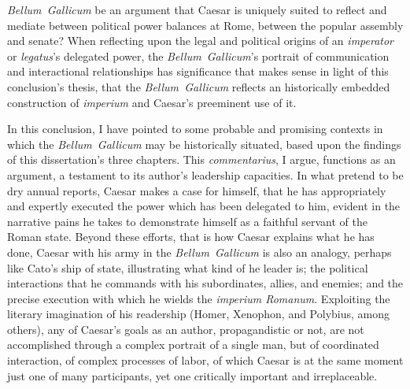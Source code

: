 \documentclass[12pt,letterpaper,oneside,final]{memoir}
\begin{document}
\emph{Bellum~Gallicum} be an argument that Caesar is uniquely suited to reflect and mediate between political power balances at Rome, between the popular assembly and senate? When reflecting upon the legal and political origins of an \emph{imperator} or \emph{legatus}'s delegated power, the \emph{Bellum~Gallicum}'s portrait of communication and interactional relationships has significance that makes sense in light of this conclusion's thesis, that the \emph{Bellum~Gallicum} reflects an historically embedded construction of \emph{imperium} and Caesar's preeminent use of it.

In this conclusion, I have pointed to some probable and promising contexts in which the \emph{Bellum~Gallicum} may be historically situated, based upon the findings of this dissertation's three chapters. This \emph{commentarius}, I argue, functions as an argument, a testament to its author's leadership capacities. In what pretend to be dry annual reports, Caesar makes a case for himself, that he has appropriately and expertly executed the power which has been delegated to him, evident in the narrative pains he takes to demonstrate himself as a faithful servant of the Roman state. Beyond these  efforts, that is how Caesar explains what he has done, Caesar with his army in the \emph{Bellum~Gallicum} is also an analogy, perhaps like Cato's ship of state, illustrating what kind of he leader is; the political interactions that he commands with his subordinates, allies, and enemies; and the precise execution with which he wields the \emph{\textlatin{imperium Romanum}}. Exploiting the literary imagination of his readership (Homer, Xenophon, and Polybius, among others), any of Caesar's goals as an author, propagandistic or not, are not accomplished through a complex portrait of a single man, but of coordinated interaction, of complex processes of labor, of which Caesar is at the same moment just one of many participants, yet one critically important and irreplaceable.
\end{document}
